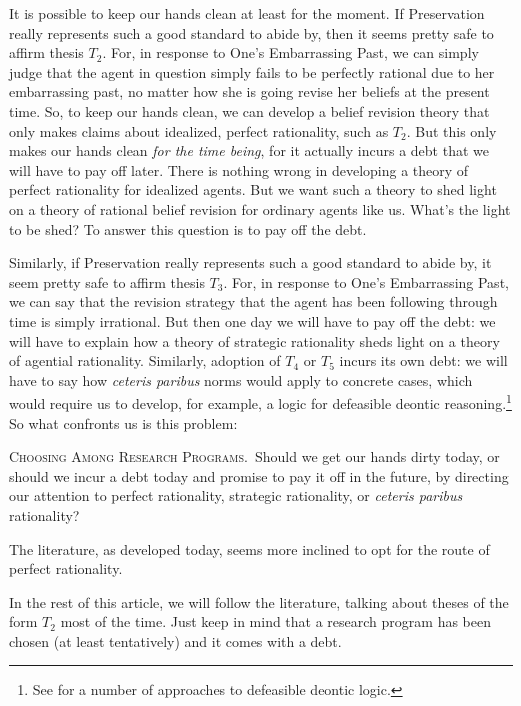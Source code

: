 It is possible to keep our hands clean at least for the moment. If Preservation really represents such a good standard to abide by, then it seems pretty safe to affirm thesis $T_2$. For, in response to One's Embarrassing Past, we can simply judge that the agent in question simply fails to be perfectly rational due to her embarrassing past, no matter how she is going revise her beliefs at the present time. So, to keep our hands clean, we can develop a belief revision theory that only makes claims about idealized, perfect rationality, such as $T_2$. But this only makes our hands clean {\em for the time being}, for it actually incurs a debt that we will have to pay off later. There is nothing wrong in developing a theory of perfect rationality for idealized agents. But we want such a theory to shed light on a theory of rational belief revision for ordinary agents like us. What's the light to be shed? To answer this question is to pay off the debt.

Similarly, if Preservation really represents such a good standard to abide by, it seem pretty safe to affirm thesis $T_3$. For, in response to One's Embarrassing Past, we can say that the revision strategy that the agent has been following through time is simply irrational. But then one day we will have to pay off the debt: we will have to explain how a theory of strategic rationality sheds light on a theory of agential rationality. Similarly, adoption of $T_4$ or $T_5$ incurs its own debt: we will have to say how {\em ceteris paribus} norms would apply to concrete cases, which would require us to develop, for example, a logic for defeasible deontic reasoning.\footnote{See \citet{nute2012defeasible} for a number of approaches to defeasible deontic logic.} So what confronts us is this problem:\op

	\xm \textsc{Choosing Among Research Programs.}\, Should we get our hands dirty today, or should we incur a debt today and promise to pay it off in the future, by directing our attention to perfect rationality, strategic rationality, or {\em ceteris paribus} rationality? 

\ed The literature, as developed today, seems more inclined to opt for the route of perfect rationality.

In the rest of this article, we will follow the literature, talking about theses of the form $T_2$ most of the time. Just keep in mind that a research program has been chosen (at least tentatively) and it comes with a debt.





